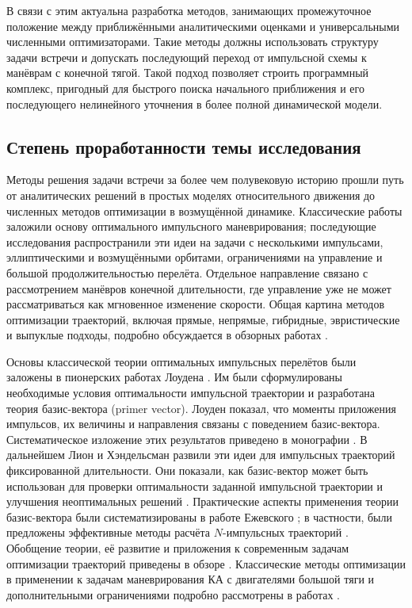 В связи с этим актуальна разработка методов, занимающих промежуточное положение между приближёнными аналитическими оценками и универсальными численными оптимизаторами. Такие методы должны использовать структуру задачи встречи и допускать последующий переход от импульсной схемы к манёврам с конечной тягой. Такой подход позволяет строить программный комплекс, пригодный для быстрого поиска начального приближения и его последующего нелинейного уточнения в более полной динамической модели.

\subsection{Степень проработанности темы исследования}

Методы решения задачи встречи за более чем полувековую историю прошли путь от аналитических решений в простых моделях относительного движения до численных методов оптимизации в возмущённой динамике. Классические работы заложили основу оптимального импульсного маневрирования; последующие исследования распространили эти идеи на задачи с несколькими импульсами, эллиптическими и возмущёнными орбитами, ограничениями на управление и большой продолжительностью перелёта. Отдельное направление связано с рассмотрением манёвров конечной длительности, где управление уже не может рассматриваться как мгновенное изменение скорости. Общая картина методов оптимизации траекторий, включая прямые, непрямые, гибридные, эвристические и выпуклые подходы, подробно обсуждается в обзорных работах \cite{luo2014survey, betts1998survey, chai2019review, morante2021survey, hughes2003comparison}.

Основы классической теории оптимальных импульсных перелётов были заложены в пионерских работах Лоудена \cite{lawden1953minimal, lawden1954fundamentals, lawden1954optimal, lawden1962impulsive}. Им были сформулированы необходимые условия оптимальности импульсной траектории и разработана теория базис-вектора (primer vector). Лоуден показал, что моменты приложения импульсов, их величины и направления связаны с поведением базис-вектора. Систематическое изложение этих результатов приведено в монографии \cite{lawden1963optimal}. В дальнейшем Лион и Хэндельсман развили эти идеи для импульсных траекторий фиксированной длительности. Они показали, как базис-вектор может быть использован для проверки оптимальности заданной импульсной траектории и улучшения неоптимальных решений \cite{lion1968primer}. Практические аспекты применения теории базис-вектора были систематизированы в работе Ежевского \cite{jezewski1975primer}; в частности, были предложены эффективные методы расчёта $N$-импульсных траекторий \cite{jezewski1968efficient}. Обобщение теории, её развитие и приложения к современным задачам оптимизации траекторий приведены в обзоре \cite{guzman2002primer}. Классические методы оптимизации в применении к задачам маневрирования КА с двигателями большой тяги и дополнительными ограничениями подробно рассмотрены в работах \cite{лейтман1965методы, ильин1976оптимальные, ивашкин1975оптимизация}.

